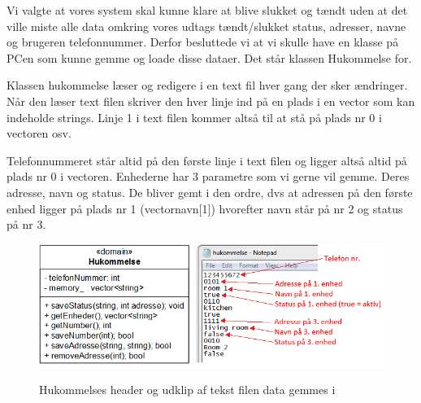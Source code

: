 Vi valgte at vores system skal kunne klare at blive slukket og tændt uden at det ville miste alle data omkring vores udtags tændt/slukket status, adresser, navne og brugeren telefonnummer. Derfor besluttede vi at vi skulle have en klasse på PCen som kunne gemme og loade disse dataer. Det står klassen Hukommelse for.
\medskip

Klassen hukommelse læser og redigere i en text fil hver gang der sker ændringer. Når den læser text filen skriver den hver linje ind på en plads i en vector som kan indeholde strings. Linje 1 i text filen kommer altså til at stå på plads nr 0 i vectoren osv.

\medskip
Telefonnummeret står altid på den første linje i text filen og ligger altså altid på plads nr 0 i vectoren. Enhederne har 3 parametre som vi gerne vil gemme. Deres adresse, navn og status. De bliver gemt i den ordre, dvs at adressen på den første enhed ligger på plads nr 1 (vectornavn[1]) hvorefter navn står på nr 2 og status på nr 3.\\

\begin{figure}[!htb]
     {\includegraphics[width=\textwidth]{billeder/uml/PC_dataview}}
     \caption{Hukommelses header og udklip af tekst filen data gemmes i}
     \label{fig:PC_dataview}
\end{figure}